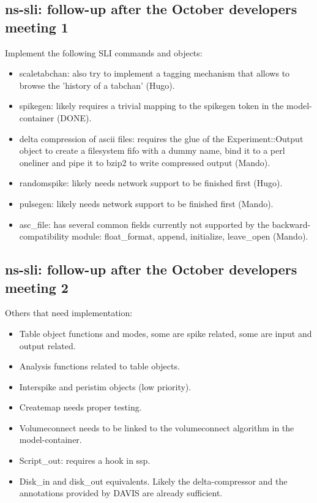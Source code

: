\documentclass[12pt]{article}
\begin{document}
\subsection{ns-sli: follow-up after the October developers meeting 1}

Implement the following SLI commands and objects:

\begin{itemize}
\item scaletabchan: also try to implement a tagging mechanism that
  allows to browse the 'history of a tabchan' (Hugo).
\item spikegen: likely requires a trivial mapping to the spikegen
  token in the model-container (DONE).
\item delta compression of ascii files: requires the glue of the
  Experiment::Output object to create a filesystem fifo with a dummy
  name, bind it to a perl oneliner and pipe it to bzip2 to write
  compressed output (Mando).
\item randomspike: likely needs network support to be finished first
  (Hugo).
\item pulsegen: likely needs network support to be finished first
  (Mando).
\item asc\_file: has several common fields currently not supported by
  the backward-compatibility module: float\_format, append, initialize,
  leave\_open (Mando).
\end{itemize}

\subsection{ns-sli: follow-up after the October developers meeting 2}

Others that need implementation:

\begin{itemize}
\item Table object functions and modes, some are spike related, some
  are input and output related.
\item Analysis functions related to table objects.
\item Interspike and peristim objects (low priority).
\item Createmap needs proper testing.
\item Volumeconnect needs to be linked to the volumeconnect algorithm
  in the model-container.
\item Script\_out: requires a hook in ssp.
\item Disk\_in and disk\_out equivalents.  Likely the delta-compressor
  and the annotations provided by DAVIS are already sufficient.
\end{itemize}
\end{document}
